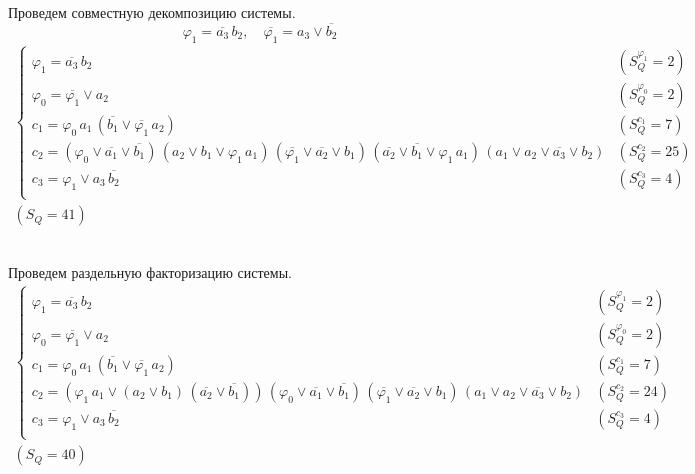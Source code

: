 \documentclass{article}
\begin{document}
\noindent\begin{minipage}{\textwidth}
Проведем совместную декомпозицию системы. \[\varphi_{1} = \overline{a_3}\,b_2, \quad \overline{\varphi_{1}} = a_3 \lor \overline{b_2}\]
\[\begin{matrix}
    \begin{cases}
        \varphi_{1} = \overline{a_3}\,b_2 & (S_Q^{\varphi_{1}} = 2) \\
        \varphi_{0} = \overline{\varphi_{1}} \lor a_2 & (S_Q^{\varphi_{0}} = 2) \\
        c_1 = \varphi_{0}\,a_1\,\left(\overline{b_1} \lor \overline{\varphi_{1}}\,a_2\right) & (S_Q^{c_1} = 7) \\
        c_2 = \left(\varphi_{0} \lor \overline{a_1} \lor \overline{b_1}\right)\,\left(a_2 \lor b_1 \lor \varphi_{1}\,a_1\right)\,\left(\overline{\varphi_{1}} \lor \overline{a_2} \lor b_1\right)\,\left(\overline{a_2} \lor \overline{b_1} \lor \varphi_{1}\,a_1\right)\,\left(a_1 \lor a_2 \lor \overline{a_3} \lor b_2\right) & (S_Q^{c_2} = 25) \\
        c_3 = \varphi_{1} \lor a_3\,\overline{b_2} & (S_Q^{c_3} = 4) \\
    \end{cases} \\ (S_Q = 41)
\end{matrix}\] \\ \phantom{0}
\end{minipage}
\noindent\begin{minipage}{\textwidth}
Проведем раздельную факторизацию системы.
\[\begin{matrix}
    \begin{cases}
        \varphi_{1} = \overline{a_3}\,b_2 & (S_Q^{\varphi_{1}} = 2) \\
        \varphi_{0} = \overline{\varphi_{1}} \lor a_2 & (S_Q^{\varphi_{0}} = 2) \\
        c_1 = \varphi_{0}\,a_1\,\left(\overline{b_1} \lor \overline{\varphi_{1}}\,a_2\right) & (S_Q^{c_1} = 7) \\
        c_2 = \left(\varphi_{1}\,a_1 \lor \left(a_2 \lor b_1\right)\,\left(\overline{a_2} \lor \overline{b_1}\right)\right)\,\left(\varphi_{0} \lor \overline{a_1} \lor \overline{b_1}\right)\,\left(\overline{\varphi_{1}} \lor \overline{a_2} \lor b_1\right)\,\left(a_1 \lor a_2 \lor \overline{a_3} \lor b_2\right) & (S_Q^{c_2} = 24) \\
        c_3 = \varphi_{1} \lor a_3\,\overline{b_2} & (S_Q^{c_3} = 4) \\
    \end{cases} \\ (S_Q = 40)
\end{matrix}\] \\ \phantom{0}
\end{minipage}
\clearpage
\end{document}
